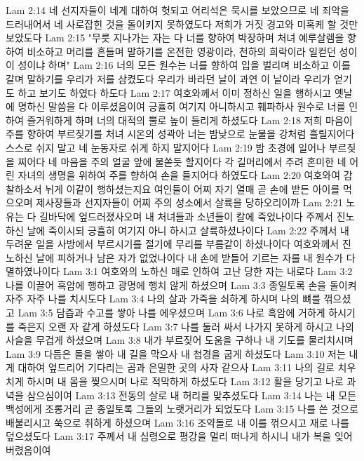 Lam 2:14  네 선지자들이 네게 대하여 헛되고 어리석은 묵시를 보았으므로 네 죄악을 드러내어서 네 사로잡힌 것을 돌이키지 못하였도다 저희가 거짓 경고와 미혹케 할 것만 보았도다
Lam 2:15  "무릇 지나가는 자는 다 너를 향하여 박장하며 처녀 예루살렘을 향하여 비소하고 머리를 흔들며 말하기를 온전한 영광이라, 천하의 희락이라 일컫던 성이 이 성이냐 하며"
Lam 2:16  너의 모든 원수는 너를 향하여 입을 벌리며 비소하고 이를 갈며 말하기를 우리가 저를 삼켰도다 우리가 바라던 날이 과연 이 날이라 우리가 얻기도 하고 보기도 하였다 하도다
Lam 2:17  여호와께서 이미 정하신 일을 행하시고 옛날에 명하신 말씀을 다 이루셨음이여 긍휼히 여기지 아니하시고 훼파하사 원수로 너를 인하여 즐거워하게 하며 너의 대적의 뿔로 높이 들리게 하셨도다
Lam 2:18  저희 마음이 주를 향하여 부르짖기를 처녀 시온의 성곽아 너는 밤낮으로 눈물을 강처럼 흘릴지어다 스스로 쉬지 말고 네 눈동자로 쉬게 하지 말지어다
Lam 2:19  밤 초경에 일어나 부르짖을 찌어다 네 마음을 주의 얼굴 앞에 물쏟듯 할지어다 각 길머리에서 주려 혼미한 네 어린 자녀의 생명을 위하여 주를 향하여 손을 들지어다 하였도다
Lam 2:20  여호와여 감찰하소서 뉘게 이같이 행하셨는지요 여인들이 어찌 자기 열매 곧 손에 받든 아이를 먹으오며 제사장들과 선지자들이 어찌 주의 성소에서 살륙을 당하오리이까
Lam 2:21  노유는 다 길바닥에 엎드러졌사오며 내 처녀들과 소년들이 칼에 죽었나이다 주께서 진노하신 날에 죽이시되 긍휼히 여기지 아니 하시고 살륙하셨나이다
Lam 2:22  주께서 내 두려운 일을 사방에서 부르시기를 절기에 무리를 부름같이 하셨나이다 여호와께서 진노하신 날에 피하거나 남은 자가 없었나이다 내 손에 받들어 기르는 자를 내 원수가 다 멸하였나이다
Lam 3:1  여호와의 노하신 매로 인하여 고난 당한 자는 내로다
Lam 3:2  나를 이끌어 흑암에 행하고 광명에 행치 않게 하셨으며
Lam 3:3  종일토록 손을 돌이켜 자주 자주 나를 치시도다
Lam 3:4  나의 살과 가죽을 쇠하게 하시며 나의 뼈를 꺾으셨고
Lam 3:5  담즙과 수고를 쌓아 나를 에우셨으며
Lam 3:6  나로 흑암에 거하게 하시기를 죽은지 오랜 자 같게 하셨도다
Lam 3:7  나를 둘러 싸서 나가지 못하게 하시고 나의 사슬을 무겁게 하셨으며
Lam 3:8  내가 부르짖어 도움을 구하나 내 기도를 물리치시며
Lam 3:9  다듬은 돌을 쌓아 내 길을 막으사 내 첩경을 굽게 하셨도다
Lam 3:10  저는 내게 대하여 엎드리어 기다리는 곰과 은밀한 곳의 사자 같으사
Lam 3:11  나의 길로 치우치게 하시며 내 몸을 찢으시며 나로 적막하게 하셨도다
Lam 3:12  활을 당기고 나로 과녁을 삼으심이여
Lam 3:13  전동의 살로 내 허리를 맞추셨도다
Lam 3:14  나는 내 모든 백성에게 조롱거리 곧 종일토록 그들의 노랫거리가 되었도다
Lam 3:15  나를 쓴 것으로 배불리시고 쑥으로 취하게 하셨으며
Lam 3:16  조약돌로 내 이를 꺾으시고 재로 나를 덮으셨도다
Lam 3:17  주께서 내 심령으로 평강을 멀리 떠나게 하시니 내가 복을 잊어 버렸음이여
